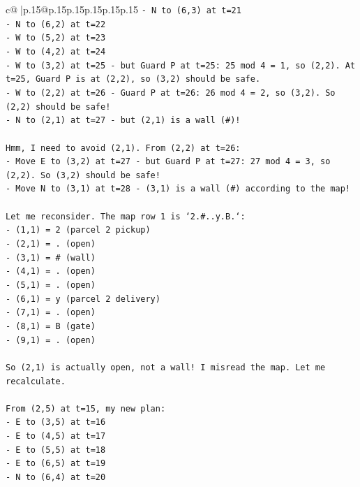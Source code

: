\documentclass{article}
\begin{document}
{\begin{supertabular}{c@{$\;$}|p{.15\linewidth}@{}p{.15\linewidth}p{.15\linewidth}p{.15\linewidth}p{.15\linewidth}p{.15\linewidth}}
{{{\texttt{{-} N to (6,3) at t=21} \\
\texttt{{-} N to (6,2) at t=22} \\
\texttt{{-} W to (5,2) at t=23} \\
\texttt{{-} W to (4,2) at t=24} \\
\texttt{{-} W to (3,2) at t=25 {-} but Guard P at t=25: 25 mod 4 = 1, so (2,2). At t=25, Guard P is at (2,2), so (3,2) should be safe.} \\
\texttt{{-} W to (2,2) at t=26 {-} Guard P at t=26: 26 mod 4 = 2, so (3,2). So (2,2) should be safe!} \\
\texttt{{-} N to (2,1) at t=27 {-} but (2,1) is a wall (\#)!} \\
\\ 
\texttt{Hmm, I need to avoid (2,1). From (2,2) at t=26:} \\
\texttt{{-} Move E to (3,2) at t=27 {-} but Guard P at t=27: 27 mod 4 = 3, so (2,2). So (3,2) should be safe!} \\
\texttt{{-} Move N to (3,1) at t=28 {-} (3,1) is a wall (\#) according to the map!} \\
\\ 
\texttt{Let me reconsider. The map row 1 is `2.\#..y.B.`:} \\
\texttt{{-} (1,1) = 2 (parcel 2 pickup)} \\
\texttt{{-} (2,1) = . (open)} \\
\texttt{{-} (3,1) = \# (wall)} \\
\texttt{{-} (4,1) = . (open)} \\
\texttt{{-} (5,1) = . (open)} \\
\texttt{{-} (6,1) = y (parcel 2 delivery)} \\
\texttt{{-} (7,1) = . (open)} \\
\texttt{{-} (8,1) = B (gate)} \\
\texttt{{-} (9,1) = . (open)} \\
\\ 
\texttt{So (2,1) is actually open, not a wall! I misread the map. Let me recalculate.} \\
\\ 
\texttt{From (2,5) at t=15, my new plan:} \\
\texttt{{-} E to (3,5) at t=16} \\
\texttt{{-} E to (4,5) at t=17} \\
\texttt{{-} E to (5,5) at t=18} \\
\texttt{{-} E to (6,5) at t=19} \\
\texttt{{-} N to (6,4) at t=20} \\
}}}
\end{supertabular}}
\end{document}
